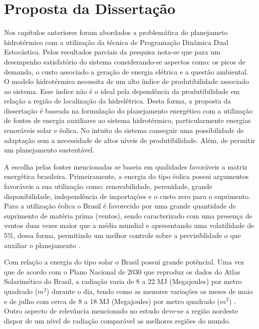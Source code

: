 \chapter{Proposta da Disserta\c c\~ao}
Nos cap\'itulos anteriores foram abordados a problem\'atica do planejameto hidrot\'ermico com a utiliza\c c\~ao da
t\'ecnica de Programa\c c\~ao Din\^amica Dual Estoc\'astica. Pelos resultados parciais da pesquisa nota-se que para um
desempenho satisfat\'orio do sistema considerando-se aspectos como: os picos de demanda, o custo associado a gera\c
c\~ao de energia el\'etrica e a quest\~ao ambiental. O modelo hidrot\'ermico necessita de um alto
\'indice de produtibilidade associado ao sistema. Esse \'indice n\~ao \'e o ideal pela depend\^encia da produtibilidade
em rela\c c\~ao a regi\~ao de localiza\c c\~ao da hidrel\'etrica. Desta forma, a proposta da disserta\c c\~ao \'e baseada na
formula\c c\~ao do planejamento energ\'etico com a utiliza\c c\~ao de fontes de energia auxiliares ao sistema
hidrot\'ermico, particularmente energias renov\'aveis solar e \'eolica. No intuito do sistema conseguir uma possibilidade
de adapta\c c\~ao sem a necessidade de altos n\'iveis de produtibilidade. Al\'em, de permitir um planejamento
sustent\'avel.

A escolha pelas fontes mencionadas se baseia em qualidades favor\'aveis a matriz energ\'etica brasileira. Primeiramente,
a energia do tipo \'eolica possui argumentos favor\'aveis a sua utiliza\c c\~ao como: renovabilidade, perenidade, grande
disponibilidade, independ\^encia de importa\c c\~oes e o custo zero para o suprimento. Para a utiliza\c c\~ao \'eolica o
Brasil \'e favorecido por uma grande quantidade de suprimento de mat\'eria prima (ventos), sendo caracterizado com uma
presen\c ca de ventos duas vezes maior que a m\'edia mundial e apresentando uma volatilidade de $5\%$, dessa forma,
permitindo um melhor controle sobre a previsiblidade  o que auxiliar o planejamento \cite{an}. 

Com rela\c c\~ao a energia do tipo solar o Brasil possui grande pot\^encial. Uma vez que de acordo com o Plano
Nacional de 2030 que reproduz os dados do Atlas Solarim\'etico do Brasil, a radia\c c\~ao varia de 8 a 22 MJ
(Megajoules) por metro quadrado ($m^{2}$) durante o dia, tendo como as menores varia\c c\~oes os meses de maio e de
julho com cerca de 8 a 18 MJ (Megajoules) por metro quadrado ($m^{2}$) \cite{an}.  Outro aspecto de relev\^ancia
mencionado no estudo deve-se a regi\~ao nordeste  dispor de um n\'ivel de radia\c c\~ao compar\'avel as melhores
regi\~oes do mundo.

